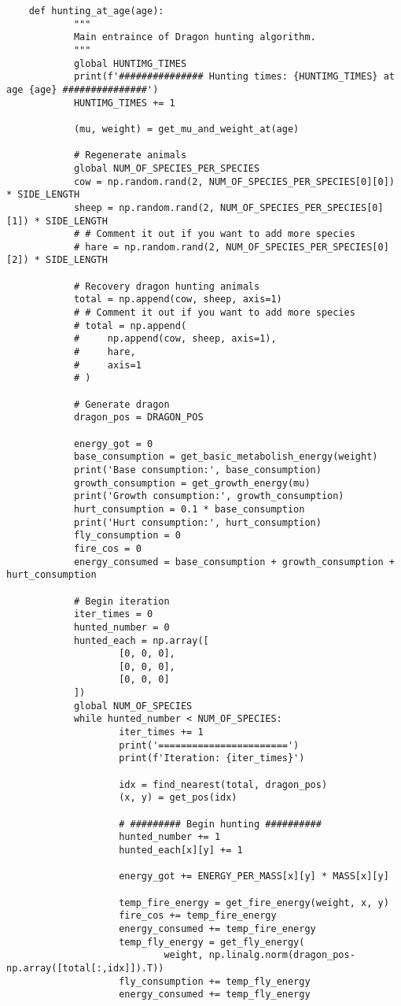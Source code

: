 \begin{lstlisting}
	def hunting_at_age(age):
			"""
			Main entraince of Dragon hunting algorithm.
			"""
			global HUNTIMG_TIMES
			print(f'############### Hunting times: {HUNTIMG_TIMES} at age {age} ###############')
			HUNTIMG_TIMES += 1

			(mu, weight) = get_mu_and_weight_at(age)

			# Regenerate animals
			global NUM_OF_SPECIES_PER_SPECIES
			cow = np.random.rand(2, NUM_OF_SPECIES_PER_SPECIES[0][0]) * SIDE_LENGTH
			sheep = np.random.rand(2, NUM_OF_SPECIES_PER_SPECIES[0][1]) * SIDE_LENGTH
			# # Comment it out if you want to add more species
			# hare = np.random.rand(2, NUM_OF_SPECIES_PER_SPECIES[0][2]) * SIDE_LENGTH

			# Recovery dragon hunting animals
			total = np.append(cow, sheep, axis=1)
			# # Comment it out if you want to add more species
			# total = np.append(
			#     np.append(cow, sheep, axis=1),
			#     hare,
			#     axis=1
			# )

			# Generate dragon
			dragon_pos = DRAGON_POS

			energy_got = 0
			base_consumption = get_basic_metabolish_energy(weight)
			print('Base consumption:', base_consumption)
			growth_consumption = get_growth_energy(mu)
			print('Growth consumption:', growth_consumption)
			hurt_consumption = 0.1 * base_consumption
			print('Hurt consumption:', hurt_consumption)
			fly_consumption = 0
			fire_cos = 0
			energy_consumed = base_consumption + growth_consumption + hurt_consumption

			# Begin iteration
			iter_times = 0
			hunted_number = 0
			hunted_each = np.array([
					[0, 0, 0],
					[0, 0, 0],
					[0, 0, 0]
			])
			global NUM_OF_SPECIES
			while hunted_number < NUM_OF_SPECIES:
					iter_times += 1
					print('=======================')
					print(f'Iteration: {iter_times}')

					idx = find_nearest(total, dragon_pos)
					(x, y) = get_pos(idx)

					# ######### Begin hunting ##########
					hunted_number += 1
					hunted_each[x][y] += 1

					energy_got += ENERGY_PER_MASS[x][y] * MASS[x][y]

					temp_fire_energy = get_fire_energy(weight, x, y)
					fire_cos += temp_fire_energy
					energy_consumed += temp_fire_energy
					temp_fly_energy = get_fly_energy(
							weight, np.linalg.norm(dragon_pos-np.array([total[:,idx]]).T))
					fly_consumption += temp_fly_energy
					energy_consumed += temp_fly_energy


\end{lstlisting}

